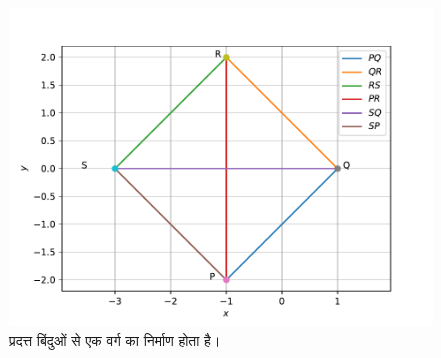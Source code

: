\begin{enumerate}[label=\thesection.\arabic*.,ref=\thesection.\theenumi]
\begin{figure}[!ht]
	\includegraphics[width=\columnwidth]{figs/quad1.pdf}
	\caption{प्रदत्त बिंदुओं से एक वर्ग का निर्माण होता है।}
	\label{fig:3.5.4_quadrilateral1}
\end{figure}


\end{enumerate}

%


